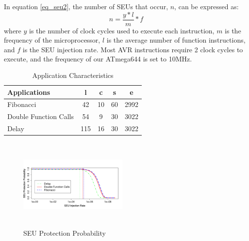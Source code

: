 In equation \ref{eq_seu2}, the number of SEUs that occur, $n$, can be expressed as:
\begin{equation}
n = \frac{y*l}{m}*f
\end{equation}
where $y$ is the number of clock cycles used to execute each instruction, $m$ is the frequency of the microprocessor, $l$ is the average number of function instructions, and $f$ is the SEU injection rate. Most AVR instructions require 2 clock cycles to execute, and the frequency of our ATmega644 is set to 10MHz.

\begin{table}
	\center
    \begin{tabular}{|l|c|c|c|c|}
    \hline
    \textbf{Applications}   & \textbf{l} & \textbf{c} & \textbf{s} & \textbf{e}	\\ \hline
    Fibonacci             		& 42			& 10		& 60	   	& 2992		\\
\hline
    Double Function Calls       & 54			& 9			& 30        & 3022		\\ \hline
    Delay         				& 115			& 16		& 30		& 3022		\\
 \hline
    \end{tabular}
    \vspace{5pt}
    \caption {Application Characteristics}
    \label{tbl_application_parameters}
\end{table}
\begin{figure}
\centering
\includegraphics[width=0.48\textwidth, height=130pt]{figures/success_probability_v2.pdf}
\vspace{5pt}
\caption{SEU Protection Probability}
\label{fig:success_probability}
\end{figure}
